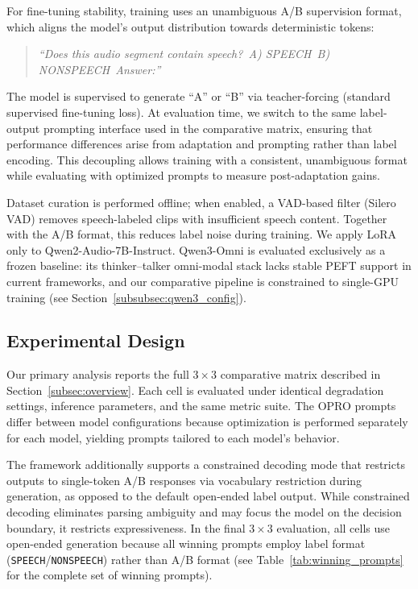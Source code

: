\documentclass[11pt,a4paper]{article}
\begin{document}
For fine-tuning stability, training uses an unambiguous A/B supervision format, which aligns the model's output distribution towards deterministic tokens:
\begin{quote}
\textit{``Does this audio segment contain speech?\ A) SPEECH\ B) NONSPEECH\ Answer:''}
\end{quote}
The model is supervised to generate ``A'' or ``B'' via teacher-forcing (standard supervised fine-tuning loss). At evaluation time, we switch to the same label-output prompting interface used in the comparative matrix, ensuring that performance differences arise from adaptation and prompting rather than label encoding. This decoupling allows training with a consistent, unambiguous format while evaluating with optimized prompts to measure post-adaptation gains.

Dataset curation is performed offline; when enabled, a VAD-based filter (Silero VAD) removes speech-labeled clips with insufficient speech content. Together with the A/B format, this reduces label noise during training. We apply LoRA only to Qwen2-Audio-7B-Instruct. Qwen3-Omni is evaluated exclusively as a frozen baseline: its thinker--talker omni-modal stack lacks stable PEFT support in current frameworks, and our comparative pipeline is constrained to single-GPU training (see Section~\ref{subsubsec:qwen3_config}).

\subsection{Experimental Design}
\label{subsec:experimental_design}

Our primary analysis reports the full $3 \times 3$ comparative matrix described in Section~\ref{subsec:overview}. Each cell is evaluated under identical degradation settings, inference parameters, and the same metric suite. The OPRO prompts differ between model configurations because optimization is performed separately for each model, yielding prompts tailored to each model's behavior.

The framework additionally supports a constrained decoding mode that restricts outputs to single-token A/B responses via vocabulary restriction during generation, as opposed to the default open-ended label output. While constrained decoding eliminates parsing ambiguity and may focus the model on the decision boundary, it restricts expressiveness. In the final $3 \times 3$ evaluation, all cells use open-ended generation because all winning prompts employ label format (\texttt{SPEECH}/\texttt{NONSPEECH}) rather than A/B format (see Table~\ref{tab:winning_prompts} for the complete set of winning prompts).
\end{document}
